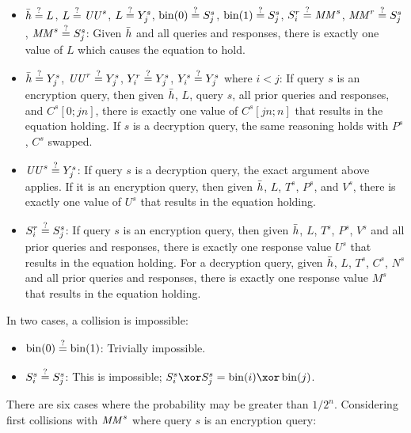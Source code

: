 \documentclass[hctr2.tex]{subfiles}
\begin{document}

\begin{itemize}
    \item
    \(\bar{h} \stackrel{\text{?}}{=} L\),
    \(L \stackrel{\text{?}}{=} \mathit{UU}^s\),
    \(L \stackrel{\text{?}}{=} Y_j^s\),
    \(\operatorname{bin}(0) \stackrel{\text{?}}{=} S_j^s\),
    \(\operatorname{bin}(1) \stackrel{\text{?}}{=} S_j^s\),
    \(S_i^r \stackrel{\text{?}}{=} \mathit{MM}^s\),
    \(\mathit{MM}^r \stackrel{\text{?}}{=} S_j^s\),
    \(\mathit{MM}^s \stackrel{\text{?}}{=} S_j^s\):
    Given \(\bar{h}\) and all queries and responses,
    there is exactly one value of \(L\)
    which causes the equation to hold.
    \item
    \(\bar{h} \stackrel{\text{?}}{=} Y_j^s\),
    \(\mathit{UU}^r \stackrel{\text{?}}{=} Y_j^s\),
    \(Y_i^r \stackrel{\text{?}}{=} Y_j^s\),
    \(Y_i^s \stackrel{\text{?}}{=} Y_j^s\) where \(i < j\): 
    If query \(s\) is an encryption query,
    then given \(\bar{h}\), \(L\), query \(s\), 
    all prior queries and responses, and
    \(C^s[0;jn]\), there is exactly one value of
    \(C^s[jn;n]\) that results in the equation holding.
    If \(s\) is a decryption query, the same reasoning holds
    with \(P^s\), \(C^s\) swapped.
    \item 
    \(\mathit{UU}^s \stackrel{\text{?}}{=} Y_j^s\):
    If query \(s\) is a decryption query,
    the exact argument above applies.
    If it is an encryption query,
    then given \(\bar{h}\), \(L\), \(T^s\), \(P^s\),
    and \(V^s\), there is exactly
    one value of \(U^s\) that results
    in the equation holding.
    \item 
    \(S_i^r \stackrel{\text{?}}{=} S_j^s\):
    If query \(s\) is an encryption query,
    then given \(\bar{h}\), \(L\), \(T^s\),
    \(P^s\), \(V^s\)
    and all prior queries and responses,
    there is exactly one response value \(U^s\)
    that results in the equation holding.
    For a decryption query, 
    given \(\bar{h}\), \(L\), \(T^s\),
    \(C^s\), \(N^s\)
    and all prior queries and responses,
    there is exactly one response value \(M^s\)
    that results in the equation holding.
\end{itemize}

In two cases, a collision is impossible:

\begin{itemize}
    \item \(\operatorname{bin}(0) \stackrel{\text{?}}{=} \operatorname{bin}(1)\): 
    Trivially impossible.
    \item 
    \(S_i^s \stackrel{\text{?}}{=} S_j^s\):
    This is impossible; 
    \(S_i^s \xor S_j^s = \fromint(i) \xor \fromint(j)\).
\end{itemize}

There are six cases where the probability may
be greater than \(1/2^n\).
Considering first collisions with \(\mathit{MM}^s\) where
query \(s\) is an encryption query:
\end{document}

